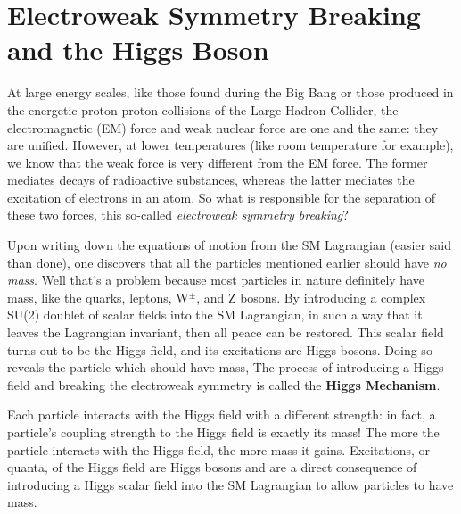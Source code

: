 \section{Electroweak Symmetry Breaking and the Higgs Boson}
\label{sec:EWSB}
At large energy scales, like those found during the Big Bang or those produced in the energetic proton-proton collisions of the Large Hadron Collider, the electromagnetic (EM) force and weak nuclear force are one and the same: they are unified.
However, at lower temperatures (like room temperature for example), we know that the weak force is very different from the EM force.
The former mediates decays of radioactive substances, whereas the latter mediates the excitation of electrons in an atom.
So what is responsible for the separation of these two forces, this so-called \emph{electroweak symmetry breaking}?

Upon writing down the equations of motion from the SM Lagrangian (easier said than done), one discovers that all the particles mentioned earlier should have \emph{no mass}.
Well that's a problem because most particles in nature definitely have mass, like the quarks, leptons, W$^{\pm}$, and Z bosons.
By introducing a complex SU(2) doublet of scalar fields into the SM Lagrangian, in such a way that it leaves the Lagrangian invariant, then all peace can be restored.
This scalar field turns out to be the Higgs field, and its excitations are Higgs bosons.
Doing so reveals the particle which should have mass,
The process of introducing a Higgs field and breaking the electroweak symmetry is called the {\bf Higgs Mechanism}.

Each particle interacts with the Higgs field with a different strength: in fact, a particle's coupling strength to the Higgs field is exactly its mass! 
The more the particle interacts with the Higgs field, the more mass it gains.
Excitations, or quanta, of the Higgs field are Higgs bosons and are a direct consequence of introducing a Higgs scalar field into the SM Lagrangian to allow particles to have mass.

